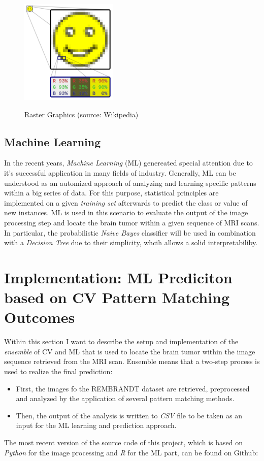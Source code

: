 \documentclass[twoside,11pt]{article}
\begin{document}
\begin{figure}
	\centering
	\includegraphics[height=5cm]{pixel}
	\label{fig:pixel}
	\caption{Raster Graphics (source: Wikipedia)}
\end{figure}%

\subsection{Machine Learning}
In the recent years, \textit{Machine Learning} (ML) genereated special attention due to it's successful application in many fields of industry. Generally, ML can be understood as an automized approach of analyzing and learning specific patterns within a big series of data. For this purpose, statistical principles are implemented on a given \textit{training set} afterwards to predict the class or value of new instances. ML is used in this scenario to evaluate the output of the image processing step and locate the brain tumor within a given sequence of MRI scans. In particular, the probabilistic \textit{Naive Bayes} classifier will be used in combination with a \textit{Decision Tree} due to their simplicity, whcih allows a solid interpretabiliby.

\section{Implementation: ML Prediciton based on CV Pattern Matching Outcomes}
Within this section I want to describe the setup and implementation of the \textit{ensemble} of CV and ML that is used to locate the brain tumor within the image sequence retrieved from the MRI scan. Ensemble means that a two-step process is used to realize the final prediction:
\begin{itemize}
	\item First, the images fo the REMBRANDT dataset are retrieved, preprocessed and analyzed by the application of several pattern matching methods.
	\item Then, the output of the analysis is written to \textit{CSV} file to be taken as an input for the ML learning and prediction approach.
\end{itemize}
The most recent version of the source code of this project, which is based on  \textit{Python} for the image processing and \textit{R} for the ML part, can be found on Github: 
\end{document}
